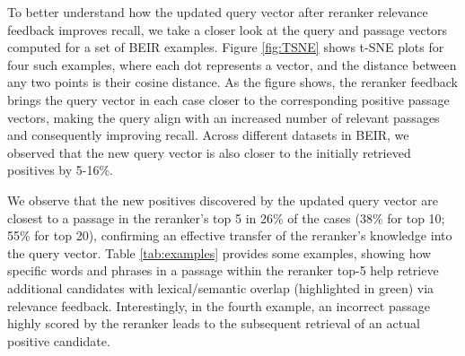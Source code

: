 To better understand how the updated query vector after reranker relevance feedback improves recall, we take a closer look at the query and passage vectors computed for a set of BEIR examples.
Figure \ref{fig:TSNE} shows t-SNE plots for four such examples, where each dot represents a vector, and the distance between any two points is their cosine distance.
As the figure shows, the reranker feedback brings the query vector in each case closer to the corresponding positive passage vectors, making the query align with an increased number of relevant passages and consequently improving recall.
Across different datasets in BEIR, we observed that the new query vector is also closer to the initially retrieved positives by 5-16\%.

We observe that the new positives discovered by the updated query vector are closest to a passage in the reranker's top 5 in 26\% of the cases (38\% for top 10; 55\% for top 20), confirming an effective transfer of the reranker's knowledge into the query vector.
Table \ref{tab:examples} provides some examples, showing how specific words and phrases in a passage within the reranker top-5 help retrieve additional candidates with lexical/semantic overlap (highlighted in green) via relevance feedback.
Interestingly, in the fourth example, an incorrect passage highly scored by the reranker leads to the subsequent retrieval of an actual positive candidate.

